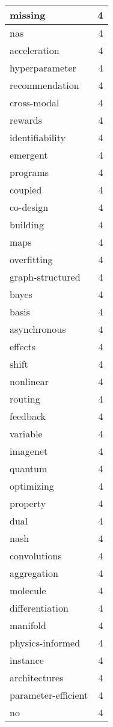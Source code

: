 \begin{table}[h]
\begin{tabular}{|l|r|}
\hline
missing & 4 \\
\hline
nas & 4 \\
\hline
acceleration & 4 \\
\hline
hyperparameter & 4 \\
\hline
recommendation & 4 \\
\hline
cross-modal & 4 \\
\hline
rewards & 4 \\
\hline
identifiability & 4 \\
\hline
emergent & 4 \\
\hline
programs & 4 \\
\hline
coupled & 4 \\
\hline
co-design & 4 \\
\hline
building & 4 \\
\hline
maps & 4 \\
\hline
overfitting & 4 \\
\hline
graph-structured & 4 \\
\hline
bayes & 4 \\
\hline
basis & 4 \\
\hline
asynchronous & 4 \\
\hline
effects & 4 \\
\hline
shift & 4 \\
\hline
nonlinear & 4 \\
\hline
routing & 4 \\
\hline
feedback & 4 \\
\hline
variable & 4 \\
\hline
imagenet & 4 \\
\hline
quantum & 4 \\
\hline
optimizing & 4 \\
\hline
property & 4 \\
\hline
dual & 4 \\
\hline
nash & 4 \\
\hline
convolutions & 4 \\
\hline
aggregation & 4 \\
\hline
molecule & 4 \\
\hline
differentiation & 4 \\
\hline
manifold & 4 \\
\hline
physics-informed & 4 \\
\hline
instance & 4 \\
\hline
architectures & 4 \\
\hline
parameter-efficient & 4 \\
\hline
no & 4 \\

\end{tabular}
\end{table}
